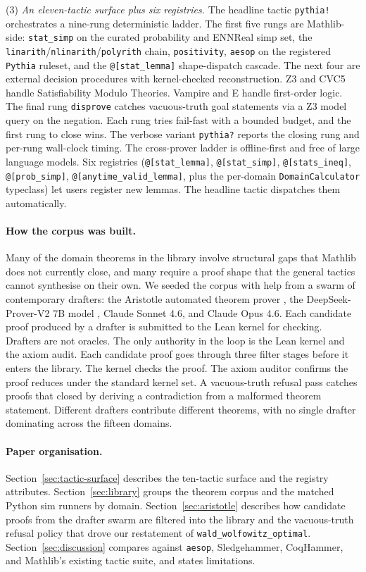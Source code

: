 (3) \emph{An eleven-tactic surface plus six registries.} The
headline tactic \texttt{pythia!} orchestrates a nine-rung
deterministic ladder. The first five rungs are Mathlib-side:
\texttt{stat\_simp} on the curated probability and ENNReal simp
set, the \texttt{linarith}/\texttt{nlinarith}/\texttt{polyrith}
chain, \texttt{positivity}, \texttt{aesop} on the registered
\texttt{Pythia} ruleset, and the \texttt{@[stat\_lemma]}
shape-dispatch cascade. The next four are external decision
procedures with kernel-checked reconstruction. Z3 and CVC5
handle Satisfiability Modulo Theories. Vampire and E handle
first-order logic. The final rung \texttt{disprove} catches
vacuous-truth goal statements via a Z3 model query on the
negation. Each rung tries fail-fast with a bounded budget, and
the first rung to close wins. The verbose variant
\texttt{pythia?} reports the closing rung and per-rung
wall-clock timing. The cross-prover ladder is offline-first and
free of large language models. Six registries
(\texttt{@[stat\_lemma]}, \texttt{@[stat\_simp]},
\texttt{@[stats\_ineq]}, \texttt{@[prob\_simp]},
\texttt{@[anytime\_valid\_lemma]}, plus the per-domain
\texttt{DomainCalculator} typeclass) let users register new
lemmas. The headline tactic dispatches them automatically.

\paragraph{How the corpus was built.}
Many of the domain theorems in the library involve structural
gaps that Mathlib does not currently close, and many require a
proof shape that the general tactics cannot synthesise on their
own. We seeded the corpus with help from a swarm of contemporary
drafters: the Aristotle automated theorem prover
\citep{harmonic2025aristotle}, the DeepSeek-Prover-V2 7B model
\citep{deepseekprover2024v2}, Claude Sonnet 4.6, and Claude Opus
4.6. Each candidate proof produced by a drafter is submitted to
the Lean kernel for checking. Drafters are not oracles. The only
authority in the loop is the Lean kernel and the axiom audit.
Each candidate proof goes through three filter stages before it
enters the library. The kernel checks the proof. The axiom
auditor confirms the proof reduces under the standard kernel
set. A vacuous-truth refusal pass catches proofs that closed by
deriving a contradiction from a malformed theorem statement.
Different drafters contribute different theorems, with no single
drafter dominating across the fifteen domains.

\paragraph{Paper organisation.}
Section~\ref{sec:tactic-surface} describes the ten-tactic surface
and the registry attributes.
Section~\ref{sec:library} groups the theorem corpus and the
matched Python sim runners by domain.
Section~\ref{sec:aristotle} describes how candidate proofs from
the drafter swarm are filtered into the library and the
vacuous-truth refusal policy that drove our restatement of
\texttt{wald\_wolfowitz\_optimal}.
Section~\ref{sec:discussion} compares against \texttt{aesop},
Sledgehammer, CoqHammer, and Mathlib's existing tactic suite,
and states limitations.

